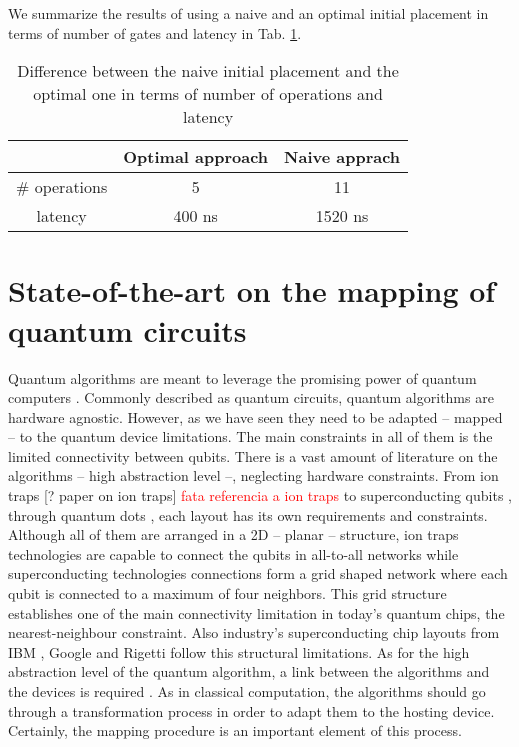 \begin{enumerate}
We summarize the results of using a naive and an optimal initial placement in terms of number of gates and latency in Tab. \ref{tab:optima_vs_naive}.


\begin{table}[htbp]
\caption{\label{tab:optima_vs_naive}
Difference between the naive initial placement and the optimal one in terms of number of operations and latency}
\centering
\begin{tabular}{ccc}
\hline
 & Optimal approach & Naive apprach\\
\hline
\# operations & 5 & 11\\
latency & 400 ns & 1520 ns\\
\hline
\end{tabular}
\end{table}
\end{enumerate}

\section{State-of-the-art on the mapping of quantum circuits}
\label{sec:orgcc4f1c8}
Quantum algorithms are meant to leverage the promising power of quantum computers \cite{coles18:quant_algor_implem_begin}.
Commonly described as quantum circuits, quantum algorithms are hardware agnostic.
However, as we have seen they need to be adapted -- mapped -- to the quantum device limitations.
The main constraints in all of them is the limited connectivity between qubits.
There is a vast amount of literature on the algorithms -- high abstraction level --, neglecting hardware constraints.
From ion traps [? paper on ion traps] \textcolor{red}{fata referencia a ion traps} to superconducting qubits \cite{Barends_2014,Versluis_2017}, through quantum dots \cite{Hill_2015,Li_2018}, each layout has its own requirements and constraints.
Although all of them are arranged in a 2D -- planar -- structure, ion traps technologies are capable to connect the qubits in all-to-all networks while superconducting technologies connections form a grid shaped network where each qubit is connected to a maximum of four neighbors.
This grid structure establishes one of the main connectivity limitation in today's quantum chips, the nearest-neighbour constraint.
Also industry's superconducting chip layouts from IBM \cite{IBM_QX}, Google \cite{boixo16:charac_quant_suprem_near_term_devic} and Rigetti \cite{Sete_2016} follow this structural limitations.
As for the high abstraction level of the quantum algorithm, a link between the algorithms and the devices is required \cite{Fu_2016}.
As in classical computation, the algorithms should go through a transformation process in order to adapt them to the hosting device.
Certainly, the mapping procedure is an important element of this process.

